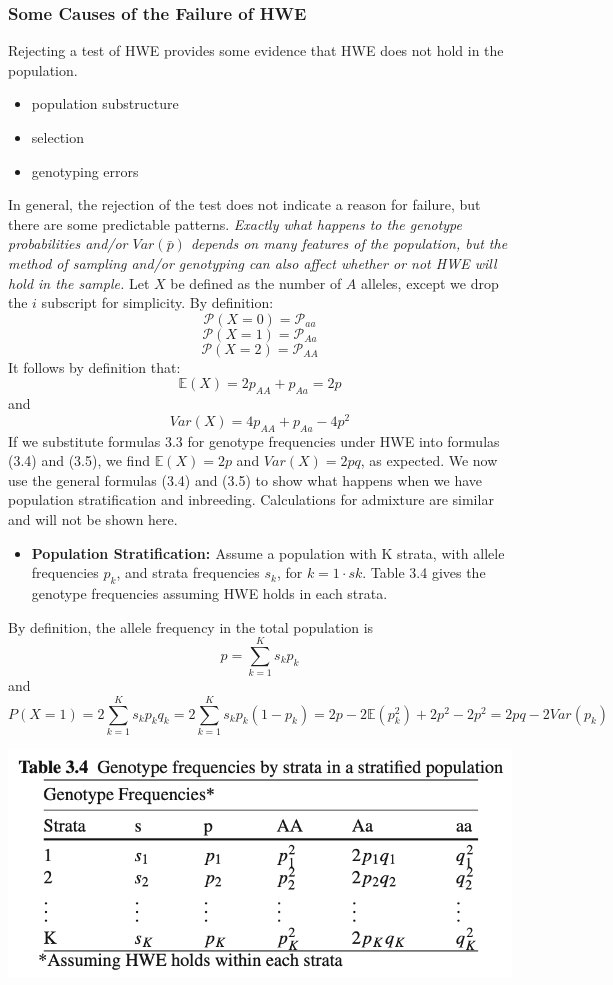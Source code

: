 \documentclass[a4paper,twoside,11pt]{article}
\begin{document}
\subsubsection{Some Causes of the Failure of HWE}
Rejecting a test of HWE provides some evidence that HWE does not hold in the population. 
\begin{itemize}
    \item population substructure
    \item selection 
    \item genotyping errors
\end{itemize}
In general, the rejection of the test does not indicate a reason for failure, but there are some predictable patterns. 
\newline
\newline
\textcolor{NavyBlue}{\textit{Exactly what happens to the genotype probabilities and/or $Var(\bar{p})$ depends on many features of the population, but the method of sampling and/or genotyping can also affect whether or not HWE will hold in the sample.}}
\newline
\newline
Let $X$ be defined as the number of $A$ alleles, except we drop the $i$ subscript for simplicity. By definition:
$$
\mathcal{P}(X=0) = \mathcal{P}_{aa}
$$
$$
\mathcal{P}(X=1) = \mathcal{P}_{Aa}
$$
$$
\mathcal{P}(X=2) = \mathcal{P}_{AA}
$$
It follows by definition that:
$$
\mathbb{E}(X) = 2 p_{AA} + p_{Aa} = 2p
$$
and
$$
Var(X) = 4p_{AA} + p_{Aa} - 4p^2
$$
If we substitute formulas 3.3 for genotype frequencies under HWE into formulas (3.4) and (3.5), we find $\mathbb{E}(X) = 2p$ and $Var(X) = 2pq$, as expected. We now use the general formulas (3.4) and (3.5) to show what happens when we have population stratification and inbreeding. Calculations for admixture are similar and will not be shown here.
\begin{itemize}
    \item \textbf{\textcolor{NavyBlue}{Population Stratification: }}Assume a population with K strata, with allele frequencies $p_k$, and strata frequencies $s_k$, for $k = 1\cdot sk$. Table 3.4 gives the genotype frequencies assuming HWE holds in each strata.
\end{itemize}
By definition, the allele frequency in the total population is
$$
p = \sum^K_{k=1} s_k p_k
$$
and 
$$
P(X=1) = 2\sum^K_{k=1} s_k p_k q_k = 2\sum^K_{k=1}s_k p_k (1-p_k) = 2p - 2\mathbb{E}(p_k^2) + 2p^2 - 2p^2 = 2pq - 2 Var(p_k)
$$
\begin{center}
\includegraphics[scale=0.5]{table3.png}
\end{center}
\end{document}
